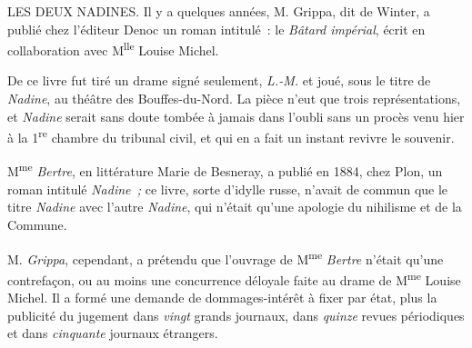\documentclass[french,twoside]{book} %
\def\mednobreak{\ifdim\lastskip<\medskipamount
  \removelastskip\nopagebreak\medskip\fi}
\newcommand{\labelblock}[1]{\medbreak{\noindent\color{rubric}\bfseries #1}\par\mednobreak}
\newenvironment{quoteblock}%
  {\begin{quoting}}
  {\end{quoting}}
\newenvironment{quotebar}{%
    \def\FrameCommand{{\color{rubric!10!}\vrule width 0.5em} \hspace{0.9em}}%
    \def\OuterFrameSep{\itemsep} %
    \MakeFramed {\advance\hsize-\width \FrameRestore}
  }%
  {%
    \endMakeFramed
  }
\renewenvironment{quoteblock}%
  {%
    \savenotes
    \setstretch{0.9}
    \normalfont
    \begin{quotebar}
  }
  {%
    \end{quotebar}
    \spewnotes
  }
\begin{document}
\begin{quoteblock}
 LES DEUX NADINES. \noindent Il y a quelques années, M. Grippa, dit de Winter, a publié chez l’éditeur Denoc un roman intitulé : le \emph{Bâtard impérial}, écrit en collaboration avec M\textsuperscript{lle} Louise Michel.\par
 De ce livre fut tiré un drame signé seulement, \emph{L.-M.} et joué, sous le titre de \emph{Nadine}, au théâtre des Bouffes-du-Nord. La pièce n’eut que trois représentations, et \emph{Nadine} serait sans doute tombée à jamais dans l’oubli sans un procès venu hier à la 1\textsuperscript{re} chambre du tribunal civil, et qui en a fait un instant revivre le souvenir.\par
   M\textsuperscript{me} \emph{Bertre}, en littérature Marie de Besneray, a publié en 1884, chez Plon, un roman intitulé \emph{Nadine ;} ce livre, sorte d’idylle russe, n’avait de commun que le titre \emph{Nadine} avec l’autre \emph{Nadine}, qui n’était qu’une apologie du nihilisme et de la Commune.\par
 M. \emph{Grippa}, cependant, a prétendu que l’ouvrage de M\textsuperscript{me} \emph{Bertre} n’était qu’une contrefaçon, ou au moins une concurrence déloyale faite au drame de M\textsuperscript{me} Louise Michel. Il a formé une demande de dommages-intérêt à fixer par état, plus la publicité du jugement dans \emph{vingt} grands journaux, dans \emph{quinze} revues périodiques et dans \emph{cinquante} journaux étrangers.
 \end{quoteblock}


\labelblock{jugement :}
\end{document}
